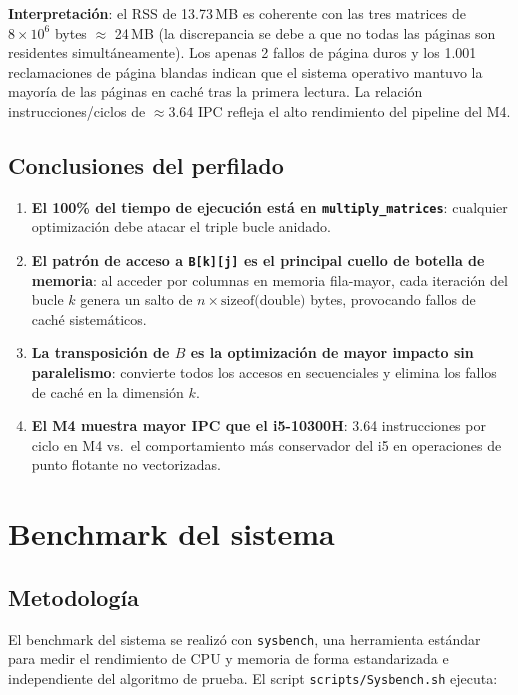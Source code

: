 \documentclass{article}
\begin{document}
\textbf{Interpretación}: el RSS de 13.73\,MB es coherente con las tres matrices de $8 \times 10^6$ bytes $\approx$ 24\,MB (la discrepancia se debe a que no todas las páginas son residentes simultáneamente). Los apenas 2 fallos de página duros y los 1.001 reclamaciones de página blandas indican que el sistema operativo mantuvo la mayoría de las páginas en caché tras la primera lectura. La relación instrucciones/ciclos de $\approx$3.64 IPC refleja el alto rendimiento del pipeline del M4.

\subsection{Conclusiones del perfilado}

\begin{enumerate}
    \item \textbf{El 100\% del tiempo de ejecución está en \texttt{multiply\_matrices}}: cualquier optimización debe atacar el triple bucle anidado.
    \item \textbf{El patrón de acceso a \texttt{B[k][j]} es el principal cuello de botella de memoria}: al acceder por columnas en memoria fila-mayor, cada iteración del bucle $k$ genera un salto de $n \times \text{sizeof(double)}$ bytes, provocando fallos de caché sistemáticos.
    \item \textbf{La transposición de $B$ es la optimización de mayor impacto sin paralelismo}: convierte todos los accesos en secuenciales y elimina los fallos de caché en la dimensión $k$.
    \item \textbf{El M4 muestra mayor IPC que el i5-10300H}: 3.64 instrucciones por ciclo en M4 vs.\ el comportamiento más conservador del i5 en operaciones de punto flotante no vectorizadas.
\end{enumerate}

\section{Benchmark del sistema}

\subsection{Metodología}

El benchmark del sistema se realizó con \texttt{sysbench}, una herramienta estándar para medir el rendimiento de CPU y memoria de forma estandarizada e independiente del algoritmo de prueba. El script \texttt{scripts/Sysbench.sh} ejecuta:
\end{document}
